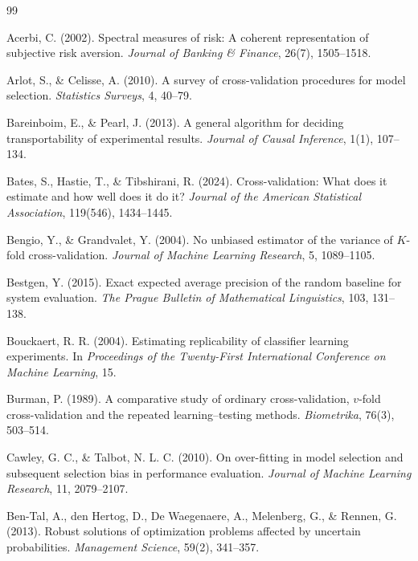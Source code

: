 \documentclass[11pt]{article}
\theoremstyle{remark}
\begin{document}
\clearpage
\begin{thebibliography}{99}
\setlength{\itemsep}{0.25em}

Acerbi, C. (2002).
Spectral measures of risk: A coherent representation of subjective risk aversion.
\emph{Journal of Banking \& Finance}, 26(7), 1505--1518.

Arlot, S., \& Celisse, A. (2010).
A survey of cross-validation procedures for model selection.
\emph{Statistics Surveys}, 4, 40--79.

Bareinboim, E., \& Pearl, J. (2013).
A general algorithm for deciding transportability of experimental results.
\emph{Journal of Causal Inference}, 1(1), 107--134.

Bates, S., Hastie, T., \& Tibshirani, R. (2024).
Cross-validation: What does it estimate and how well does it do it?
\emph{Journal of the American Statistical Association}, 119(546), 1434--1445.

Bengio, Y., \& Grandvalet, Y. (2004).
No unbiased estimator of the variance of $K$-fold cross-validation.
\emph{Journal of Machine Learning Research}, 5, 1089--1105.

Bestgen, Y. (2015).
Exact expected average precision of the random baseline for system evaluation.
\emph{The Prague Bulletin of Mathematical Linguistics}, 103, 131--138.

Bouckaert, R. R. (2004).
Estimating replicability of classifier learning experiments.
In \emph{Proceedings of the Twenty-First International Conference on Machine Learning}, 15.

Burman, P. (1989).
A comparative study of ordinary cross-validation, $v$-fold cross-validation
and the repeated learning--testing methods.
\emph{Biometrika}, 76(3), 503--514.

Cawley, G. C., \& Talbot, N. L. C. (2010).
On over-fitting in model selection and subsequent selection bias in performance
evaluation.
\emph{Journal of Machine Learning Research}, 11, 2079--2107.

Ben-Tal, A., den Hertog, D., De Waegenaere, A., Melenberg, G., \& Rennen, G. (2013).
Robust solutions of optimization problems affected by uncertain probabilities.
\emph{Management Science}, 59(2), 341--357.


\end{thebibliography}
\end{document}
